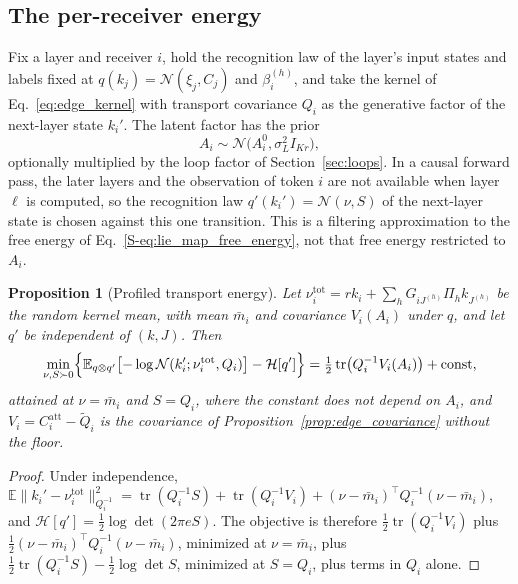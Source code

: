 \documentclass[11pt]{article}
\newtheorem{proposition}[theorem]{Proposition}
\theoremstyle{definition}
\theoremstyle{remark}
\providecommand{\tr}{\operatorname{tr}}
\newcommand{\E}{\mathbb E}
\newcommand{\Gauss}{\mathcal N}
\newcommand{\Sref}[1]{\ref{S-#1}}
\begin{document}
\subsection{The per-receiver energy}

Fix a layer and receiver $i$, hold the recognition law of the layer's input states and labels fixed at $q(k_j)=\Gauss(\xi_j,C_j)$ and $\beta_i^{(h)}$, and take the kernel of Eq.~\eqref{eq:edge_kernel} with transport covariance $Q_i$ as the generative factor of the next-layer state $k_i'$. The latent factor has the prior
\begin{equation}
A_i\sim\Gauss\bigl(A_i^0,\sigma_L^2I_{Kr}\bigr),
\label{eq:factor_prior}
\end{equation}
optionally multiplied by the loop factor of Section~\ref{sec:loops}. In a causal forward pass, the later layers and the observation of token $i$ are not available when layer $\ell$ is computed, so the recognition law $q'(k_i')=\Gauss(\nu,S)$ of the next-layer state is chosen against this one transition. This is a filtering approximation to the free energy of Eq.~\Sref{eq:lie_map_free_energy}, not that free energy restricted to $A_i$.

\begin{proposition}[Profiled transport energy]
\label{prop:profiled}
Let $\nu_i^{\mathrm{tot}}=rk_i+\sum_hG_{iJ^{(h)}}\Pi_hk_{J^{(h)}}$ be the random kernel mean, with mean $\bar m_i$ and covariance $V_i(A_i)$ under $q$, and let $q'$ be independent of $(k,J)$. Then
\begin{equation}
\min_{\nu,S\succ0}\Bigl\{\E_{q\otimes q'}\bigl[-\log\Gauss(k_i';\nu_i^{\mathrm{tot}},Q_i)\bigr]-\mathcal H[q']\Bigr\}=\tfrac12\tr\bigl(Q_i^{-1}V_i(A_i)\bigr)+\mathrm{const},
\label{eq:profiled}
\end{equation}
attained at $\nu=\bar m_i$ and $S=Q_i$, where the constant does not depend on $A_i$, and $V_i=C_i^{\mathrm{att}}-\widetilde Q_i$ is the covariance of Proposition~\ref{prop:edge_covariance} without the floor.
\end{proposition}
\begin{proof}
Under independence, $\E\|k_i'-\nu_i^{\mathrm{tot}}\|_{Q_i^{-1}}^2=\tr(Q_i^{-1}S)+\tr(Q_i^{-1}V_i)+(\nu-\bar m_i)^\top Q_i^{-1}(\nu-\bar m_i)$, and $\mathcal H[q']=\tfrac12\log\det(2\pi eS)$. The objective is therefore $\tfrac12\tr(Q_i^{-1}V_i)$ plus $\tfrac12(\nu-\bar m_i)^\top Q_i^{-1}(\nu-\bar m_i)$, minimized at $\nu=\bar m_i$, plus $\tfrac12\tr(Q_i^{-1}S)-\tfrac12\log\det S$, minimized at $S=Q_i$, plus terms in $Q_i$ alone.
\end{proof}
\end{document}
